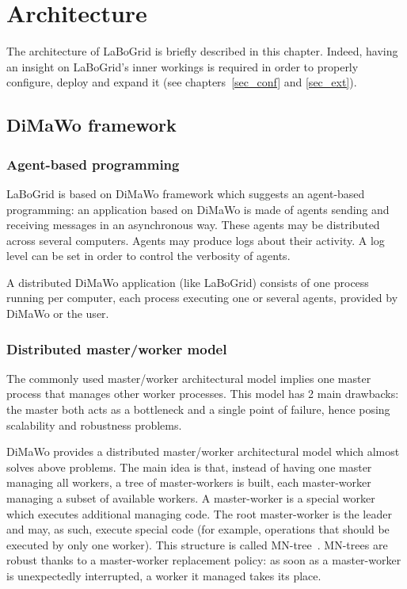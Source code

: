 \chapter{Architecture}
\label{sec_arch}

The architecture of LaBoGrid is briefly described in this chapter. Indeed,
having an insight on LaBoGrid's inner workings is required in order to properly
configure, deploy and expand it (see chapters~\ref{sec_conf} and \ref{sec_ext}).


\section{DiMaWo framework}
\label{sec_arch_dimawo}

\subsection{Agent-based programming}
\label{sec_arch_dimawo_agents}

LaBoGrid is based on DiMaWo framework which suggests an agent-based programming:
an application based on DiMaWo is made of agents sending and receiving messages
in an asynchronous way. These agents may be distributed across several
computers. Agents may produce logs about their activity. A log level can be set
in order to control the verbosity of agents.

A distributed DiMaWo application (like LaBoGrid) consists of one
process running per computer, each process executing one or several agents,
provided by DiMaWo or the user.


\subsection{Distributed master/worker model}
\label{sec_arch_dimawo_model}

The commonly used master/worker architectural model implies one master process
that manages other worker processes. This model has 2 main drawbacks: the master
both acts as a bottleneck and a single point of failure, hence posing
scalability and robustness problems.

DiMaWo provides a distributed master/worker architectural model
which almost solves above problems. The main idea is
that, instead of having one master managing all workers, a tree of
master-workers is built, each master-worker managing a subset of available
workers. A master-worker is a special worker which executes additional managing
code. The root master-worker is the leader and may, as such, execute special
code (for example, operations that should be executed by only one worker).
This structure is called MN-tree~\cite{Dethier11}. MN-trees are robust thanks to a
master-worker replacement policy: as soon as a master-worker is unexpectedly interrupted, a
worker it managed takes its place.

